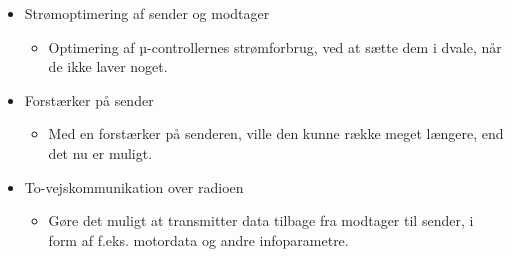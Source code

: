 \documentclass[Main]{subfiles}
\begin{document}
\begin{itemize}
\item Strømoptimering af sender og modtager
\vspace{-10pt}
	\begin{itemize}
	\item Optimering af µ-controllernes strømforbrug, ved at sætte dem i dvale, når de ikke laver noget.
	\end{itemize}

\item Forstærker på sender
\vspace{-10pt}
	\begin{itemize}
	\item Med en forstærker på senderen, ville den kunne række meget længere, end det nu er muligt.
	\end{itemize}
	
\item To-vejskommunikation over radioen
\vspace{-10pt}
	\begin{itemize}
	\item Gøre det muligt at transmitter data tilbage fra modtager til sender, i form af f.eks. motordata og andre infoparametre.
	\end{itemize}	
	

\end{itemize}
\end{document}
